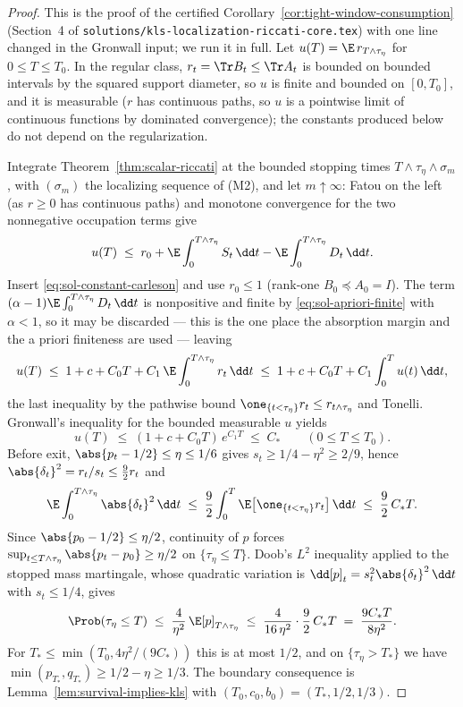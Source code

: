 \documentclass[../main.tex]{subfiles}
\begin{document}
\begin{proof}
This is the proof of the certified Corollary~\ref{cor:tight-window-consumption}
(Section~4 of \texttt{solutions/kls-localization-}\allowbreak\texttt{riccati-core.tex}) with
one line changed in the Gronwall input; we run it in full.  Let $u(T)=\E\,r_{T\wedge\tau_\eta}$ for
$0\le T\le T_0$.  In the regular class, $r_t=\Tr B_t\le\Tr A_t$ is bounded on bounded
intervals by the squared support diameter, so $u$ is finite and bounded on $[0,T_0]$, and it
is measurable ($r$ has continuous paths, so $u$ is a pointwise limit of continuous
functions by dominated convergence); the constants produced below do not depend on the
regularization.

Integrate Theorem~\ref{thm:scalar-riccati} at the bounded stopping times
$T\wedge\tau_\eta\wedge\sigma_m$, with $(\sigma_m)$ the localizing sequence of (M2), and let
$m\uparrow\infty$: Fatou on the left (as $r\ge0$ has continuous paths) and monotone
convergence for the two nonnegative occupation terms give
\[
  u(T)\;\le\;r_0+\E\int_0^{T\wedge\tau_\eta}S_t\,\dd t
             -\E\int_0^{T\wedge\tau_\eta}D_t\,\dd t .
\]
Insert \eqref{eq:sol-constant-carleson} and use $r_0\le1$ (rank-one $B_0\preceq A_0=I$).
The term $(\alpha-1)\E\int_0^{T\wedge\tau_\eta}D_t\,\dd t$ is nonpositive and finite by
\eqref{eq:sol-apriori-finite} with $\alpha<1$, so it may be discarded — this is the one
place the absorption margin and the a priori finiteness are used — leaving
\[
  u(T)\;\le\;1+c+C_0T
        +C_1\,\E\int_0^{T\wedge\tau_\eta}r_t\,\dd t
  \;\le\;1+c+C_0T+C_1\int_0^Tu(t)\,\dd t ,
\]
the last inequality by the pathwise bound
$\one_{\{t<\tau_\eta\}}r_t\le r_{t\wedge\tau_\eta}$ and Tonelli.  Gronwall's inequality for
the bounded measurable $u$ yields
\[
  u(T)\;\le\;(1+c+C_0T)\,e^{C_1T}\;\le\;C_*
  \qquad(0\le T\le T_0).
\]
Before exit, $\abs{p_t-1/2}\le\eta\le1/6$ gives
$s_t\ge1/4-\eta^2\ge2/9$, hence
$\abs{\delta_t}^2=r_t/s_t\le\tfrac92 r_t$ and
\[
  \E\int_0^{T\wedge\tau_\eta}\abs{\delta_t}^2\,\dd t
  \;\le\;\frac92\int_0^T\E\bigl[\one_{\{t<\tau_\eta\}}r_t\bigr]\,\dd t
  \;\le\;\frac92\,C_*T .
\]
Since $\abs{p_0-1/2}\le\eta/2$, continuity of $p$ forces
$\sup_{t\le T\wedge\tau_\eta}\abs{p_t-p_0}\ge\eta/2$ on $\{\tau_\eta\le T\}$.  Doob's $L^2$
inequality applied to the stopped mass martingale, whose quadratic variation is
$\dd[p]_t=s_t^2\abs{\delta_t}^2\,\dd t$ with $s_t\le1/4$, gives
\[
  \Prob(\tau_\eta\le T)
  \;\le\;\frac4{\eta^2}\,\E[p]_{T\wedge\tau_\eta}
  \;\le\;\frac{4}{16\,\eta^2}\cdot\frac92\,C_*T
  \;=\;\frac{9C_*T}{8\eta^2}.
\]
For $T_*\le\min(T_0,4\eta^2/(9C_*))$ this is at most $1/2$, and on
$\{\tau_\eta>T_*\}$ we have $\min(p_{T_*},q_{T_*})\ge1/2-\eta\ge1/3$.  The boundary
consequence is Lemma~\ref{lem:survival-implies-kls} with
$(T_0,c_0,b_0)=(T_*,1/2,1/3)$.
\end{proof}
\end{document}
